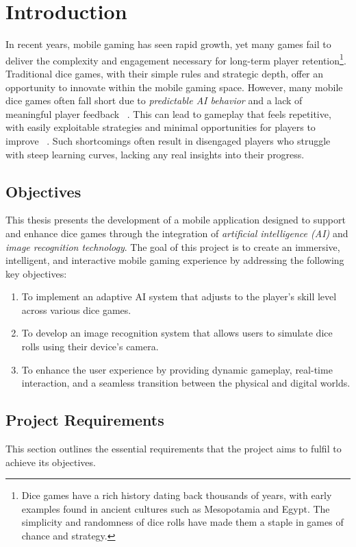 
\chapter{Introduction}
\label{chap:introduction}

In recent years, mobile gaming has seen rapid growth, yet many games fail to deliver the complexity and engagement necessary for long-term player retention\footnote{Dice games have a rich history dating back thousands of years, with early examples found in ancient cultures such as Mesopotamia and Egypt. The simplicity and randomness of dice rolls have made them a staple in games of chance and strategy.}. Traditional dice games, with their simple rules and strategic depth, offer an opportunity to innovate within the mobile gaming space. However, many mobile dice games often fall short due to \emph{predictable AI behavior} and a lack of meaningful player feedback ~\cite{bib:appannie}. This can lead to gameplay that feels repetitive, with easily exploitable strategies and minimal opportunities for players to improve ~\cite{bib:yannakakis}. Such shortcomings often result in disengaged players who struggle with steep learning curves, lacking any real insights into their progress.

\section{Objectives}
This thesis presents the development of a mobile application designed to support and enhance dice games through the integration of \emph{artificial intelligence (AI)} and \emph{image recognition technology}. The goal of this project is to create an immersive, intelligent, and interactive mobile gaming experience by addressing the following key objectives:
\begin{enumerate}
    \item To implement an adaptive AI system that adjusts to the player’s skill level across various dice games.
    \item To develop an image recognition system that allows users to simulate dice rolls using their device's camera.
    \item To enhance the user experience by providing dynamic gameplay, real-time interaction, and a seamless transition between the physical and digital worlds.
\end{enumerate}

\section{Project Requirements}
This section outlines the essential requirements that the project aims to fulfil to achieve its objectives.

